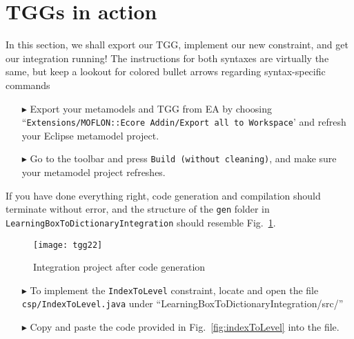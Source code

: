 \newpage
\section{TGGs in action}
\genHeader
\label{sect:TGGs_in_Action}
In this section, we shall export our TGG, implement our new constraint, and get our integration running! The instructions for both syntaxes are virtually the
same, but keep a lookout for colored bullet arrows regarding syntax-specific commands

\vspace{0.5cm}

\begin{itemize}
\item[\color{RedOrange}$\blacktriangleright$] Export your metamodels and TGG from EA by choosing ``\texttt{Extensions/\-MOFLON::\-Ecore Addin\-/Export all to
Workspace}' and refresh your Eclipse metamodel project.

\vspace{0.5cm}

\item[\color{CornflowerBlue}$\blacktriangleright$] Go to the toolbar and press \texttt{Build (without cleaning)}, and make sure your metamodel project
refreshes.
\end{itemize}

\vspace{0.5cm}

If you have done everything right, code generation and compilation should terminate without error, and the structure of the \texttt{gen} folder in
\texttt{LearningBox\-To\-Dictionary\-Integration} should resemble Fig.~\ref{fig:gen_folder}.

\begin{figure}[htbp]
\begin{center}
  \texttt{[image: tgg22]}
  \caption{Integration project after code generation}
  \label{fig:gen_folder}
\end{center}
\end{figure}

\begin{itemize}

\vspace{0.5cm}
  
\item[$\blacktriangleright$] To implement the \texttt{IndexToLevel} constraint, locate and open the file \texttt{csp/IndexToLevel.java} under
  ``LearningBoxToDictionaryIntegration/src/'' 

\vspace{0.5cm}
  
\item[$\blacktriangleright$] Copy and paste the code provided in Fig.~\ref{fig:indexToLevel} into the file.

\end{itemize}

